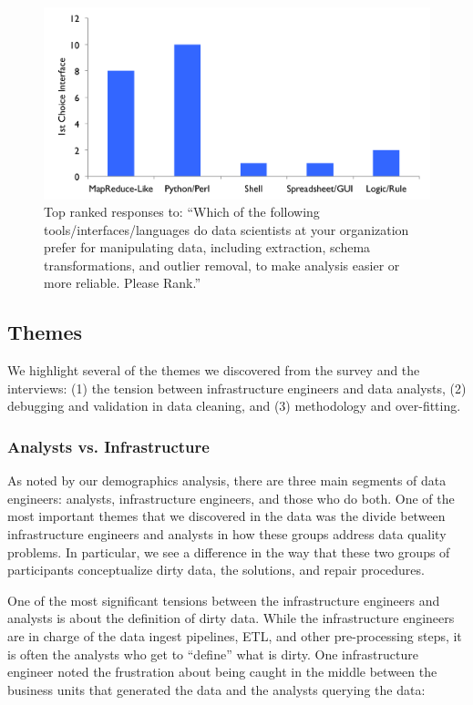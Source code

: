 \begin{figure}[t]
\centering
 \includegraphics[width=\columnwidth]{datafigs/hilda-interface.png}
 \caption{Top ranked responses to: ``Which of the following tools/interfaces/languages do data scientists at your organization prefer for manipulating data, including extraction, schema transformations, and outlier removal, to make analysis easier or more reliable. Please Rank.''\label{fig:interfaces}}
\end{figure}


\subsection{Themes}\label{sec:themes}
We highlight several of the themes we discovered from the survey and the interviews: (1) the tension between infrastructure engineers and data analysts, (2) debugging and validation in data cleaning, and (3) methodology and over-fitting.

\subsubsection{Analysts vs. Infrastructure}
As noted by our demographics analysis, there are three main segments of data engineers: analysts, infrastructure engineers, and those who do both.
One of the most important themes that we discovered in the data was the divide between infrastructure engineers and analysts in how these groups address data quality problems. In particular, we see a difference in the way that these two groups of participants conceptualize dirty data, the solutions, and repair procedures.

One of the most significant tensions between the infrastructure engineers and analysts is about the definition of dirty data. While the infrastructure engineers are in charge of the data ingest pipelines, ETL, and other pre-processing steps, it is often the analysts who get to ``define'' what is dirty. One infrastructure engineer noted the frustration about being caught in the middle between the business units that generated the data and the analysts querying the data:

